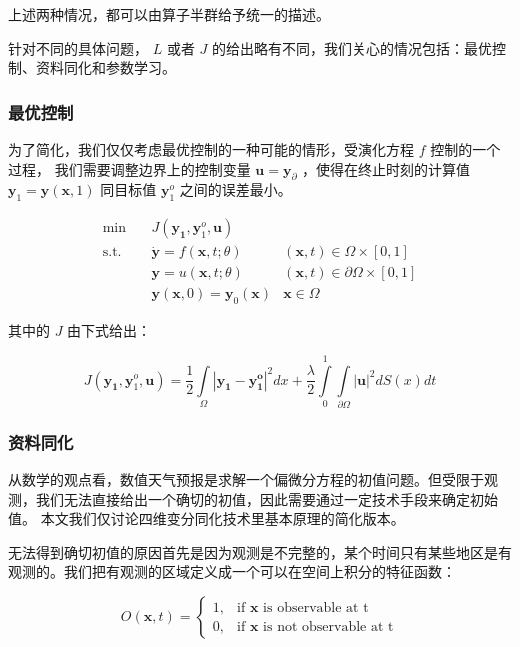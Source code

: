 \documentclass[a4paper,12pt]{article}
\begin{document}
上述两种情况，都可以由算子半群给予统一的描述。

针对不同的具体问题， $ L $ 或者 $ J $ 的给出略有不同，我们关心的情况包括：最优控制、资料同化和参数学习。

\subsubsection{最优控制}

为了简化，我们仅仅考虑最优控制的一种可能的情形，受演化方程 $ f $ 控制的一个过程，
我们需要调整边界上的控制变量 $ \mathbf{u} = \mathbf{y}_{\partial} $ ，使得在终止时刻的计算值 $ \mathbf{y}_1 = \mathbf{y}(\mathbf{x}, 1)$ 同目标值 $ \mathbf{y}_1^o $ 之间的误差最小。

$$
\begin{array}{rcll}
\min &~& J(\mathbf{y_1}, \mathbf{y}_1^o, \mathbf{u}) & \\
\mathrm{s.t.} &~& \dot{\mathbf{y}} = f(\mathbf{x}, t; \theta) & (\mathbf{x}, t) \in \Omega \times [0, 1] \\
&~& \mathbf{y} = u(\mathbf{x}, t; \theta) & (\mathbf{x}, t) \in \partial \Omega \times [0, 1] \\
&~& \mathbf{y}(\mathbf{x}, 0) = \mathbf{y}_0(\mathbf{x}) & \mathbf{x} \in \Omega
\end{array}
$$

其中的 $ J $ 由下式给出：

$$
J(\mathbf{y_1}, \mathbf{y}_1^o, \mathbf{u}) = \frac{1}{2} \int\limits_{\Omega}|\mathbf{y_1} - \mathbf{y_1^o}|^2dx +  \frac{\lambda}{2} \int\limits_{0}^{1}\int\limits_{\partial \Omega} |\mathbf{u}|^2 dS(x) dt
$$


\subsubsection{资料同化}

从数学的观点看，数值天气预报是求解一个偏微分方程的初值问题。但受限于观测，我们无法直接给出一个确切的初值，因此需要通过一定技术手段来确定初始值。
本文我们仅讨论四维变分同化技术里基本原理的简化版本。

无法得到确切初值的原因首先是因为观测是不完整的，某个时间只有某些地区是有观测的。我们把有观测的区域定义成一个可以在空间上积分的特征函数：

$$
O(\mathbf{x}, t) = \begin{cases}
1, & \text{if }\mathbf{x} \text{ is observable at t} \\
0, & \text{if }\mathbf{x} \text{ is not observable at t}
\end{cases}
$$
\end{document}
